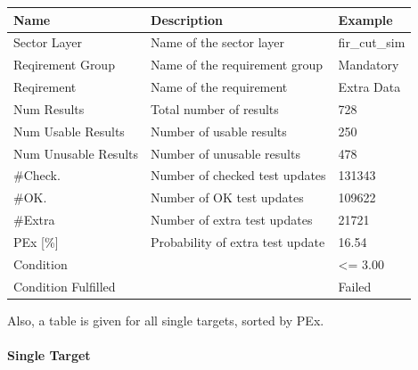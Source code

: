 \begin{center}
 \begin{table}[H]
  \begin{tabularx}{\textwidth}{ | l | X |  l | }
    \hline
    \textbf{Name} & \textbf{Description} & \textbf{Example} \\ \hline
    Sector Layer & Name of the sector layer & fir\_cut\_sim  \\ \hline
    Reqirement Group & Name of the requirement group & Mandatory  \\ \hline
    Reqirement & Name of the requirement & Extra Data  \\ \hline 
    Num Results & Total number of results & 728 \\ \hline
    Num Usable Results & Number of usable results & 250 \\ \hline
    Num Unusable Results & Number of unusable results & 478 \\ \hline
    \#Check. & Number of checked test updates & 131343 \\ \hline
    \#OK. & Number of OK test updates & 109622 \\ \hline
    \#Extra & Number of extra test updates & 21721 \\ \hline
    PEx [\%] & Probability of extra test update & 16.54 \\ \hline
    Condition &  & <= 3.00 \\ \hline
    Condition Fulfilled &  & Failed \\ \hline
\end{tabularx}
\end{table}
\end{center}

Also, a table is given for all single targets, sorted by PEx.

\paragraph{Single Target}

